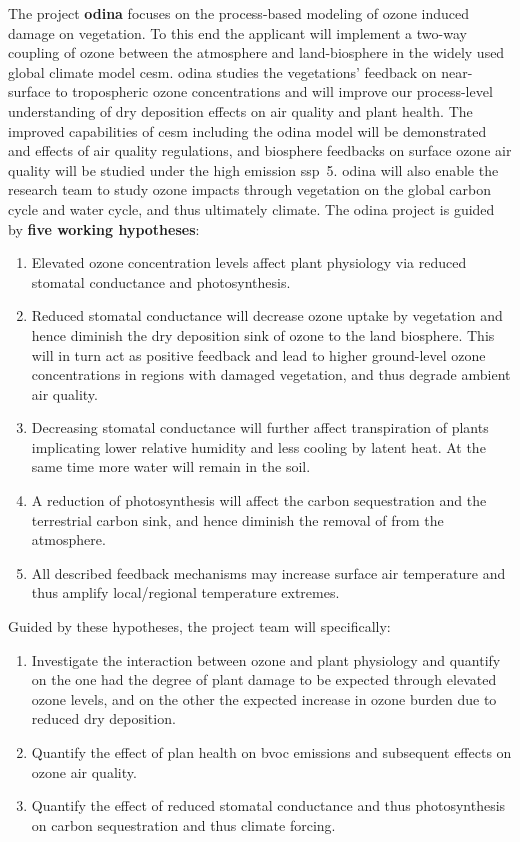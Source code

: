 
The project \textbf{\gls{odina}} focuses on the process-based modeling of ozone induced damage on vegetation. To this end the applicant will implement a two-way coupling of ozone between the atmosphere and land-biosphere in the widely used global climate model \gls{cesm}. \gls{odina} studies the vegetations' feedback on near-surface to tropospheric ozone concentrations and will improve our process-level understanding of dry deposition effects on air quality and plant health. The improved capabilities of \gls{cesm} including the \gls{odina} model will be demonstrated and effects of air quality regulations, and biosphere feedbacks on surface ozone air quality will be studied under the high emission \gls{ssp}~5. \gls{odina} will also enable the research team to study ozone impacts through vegetation on the global carbon cycle and water cycle, and thus ultimately climate.
The \gls{odina} project is guided by \textbf{five working hypotheses}: 

\begin{enumerate}
\itemsep0pt
\item Elevated ozone concentration levels affect plant physiology via reduced stomatal conductance and photosynthesis. 
\item Reduced stomatal conductance will decrease ozone uptake by vegetation and hence diminish the dry deposition sink of ozone to the land biosphere. This will in turn act as positive feedback and lead to higher ground-level ozone concentrations in regions with damaged vegetation, and thus degrade ambient air quality.
\item Decreasing stomatal conductance will further affect transpiration of plants implicating lower relative humidity and less cooling by latent heat. At the same time more water will remain in the soil.
\item A reduction of photosynthesis will affect the carbon sequestration and the terrestrial carbon sink, and hence diminish the removal of  from the atmosphere.
\item All described feedback mechanisms may increase surface air temperature and thus amplify local/regional temperature extremes.
\end{enumerate}

Guided by these hypotheses, the project team will specifically:
\begin{enumerate}
\itemsep0pt
\item Investigate the interaction between ozone and plant physiology and quantify on the one had the degree of plant damage to be expected through elevated ozone levels, and on the other the expected increase in ozone burden due to reduced dry deposition.
\item Quantify the effect of plan health on \gls{bvoc} emissions and subsequent effects on ozone air quality.
\item Quantify the effect of reduced stomatal conductance and thus photosynthesis on carbon sequestration and thus climate forcing.
\end{enumerate}

